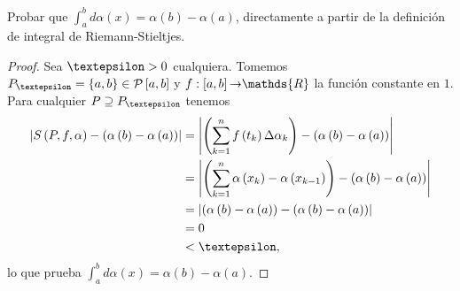 \setcounter{section}{7}
\setcounter{exercise}{0}

\begin{exercise}
  \label{exercise:7.1}
  Probar que $\int_{a}^{b}d\alpha\left(x\right)=\alpha\left(b\right)-\alpha\left(a\right)$, directamente a partir de la definición de integral de Riemann-Stieltjes.
\end{exercise}

\begin{proof}

Sea $\text{\textepsilon}>0$ cualquiera. Tomemos $P_{\text{\textepsilon}}=\left\lbrace a,b\right\rbrace\in\mathcal{P}\left[a,b\right]$ y $f:\left[a,b\right]\text{\textrightarrow}\mathds{R}$ la función constante en $1$. Para cualquier $P\supseteq P_{\text{\textepsilon}}$ tenemos
\begin{align*}
  \left| S\left(P,f,\alpha\right)-\left(\alpha\left(b\right)-\alpha\left(a\right)\right)\right|&=\left|\left(\sum_{k=1}^{n}f\left(t_k\right)\Delta\alpha_k\right)-\left(\alpha\left(b\right)-\alpha\left(a\right)\right) \right|\\
  &=\left|\left(\sum_{k=1}^{n} \alpha\left(x_k\right)-\alpha\left(x_{k-1}\right)\right)-\left(\alpha\left(b\right)-\alpha\left(a\right)\right)\right|\\
  &=\left|\left(\alpha\left(b\right)-\alpha\left(a\right)\right)-\left(\alpha\left(b\right)-\alpha\left(a\right)\right)\right|\\
  &=0\\
  &<\text{\textepsilon},
\end{align*}
lo que prueba $\int_{a}^{b}d\alpha\left(x\right)=\alpha\left(b\right)-\alpha\left(a\right)$.
  
\end{proof}
